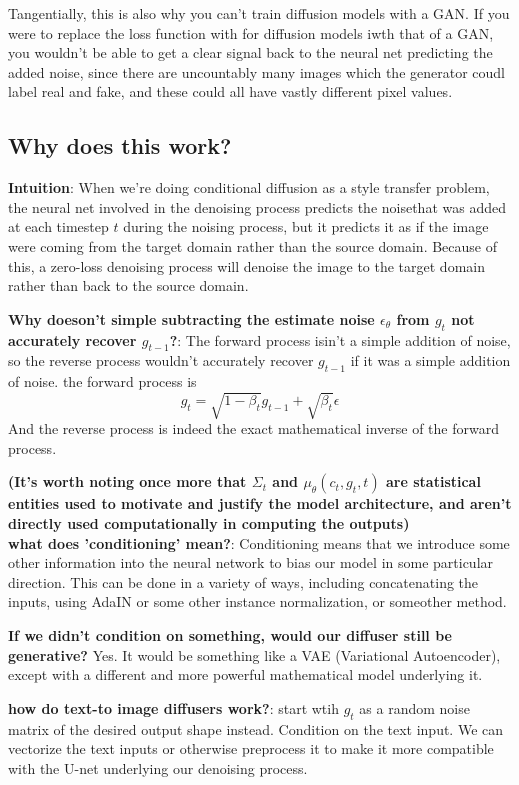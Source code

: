 \documentclass[12pt]{article}
\begin{document}
Tangentially, this is also why you can't train diffusion models with a GAN. If you were to replace the loss function with for diffusion models iwth that of a GAN, you wouldn't be able to get a clear signal back to the neural net predicting the added noise, since there are uncountably many images which the generator coudl label real and fake, and these could all have vastly different pixel values. 
\subsection{Why does this work?}

\textbf{Intuition}: When we're doing conditional diffusion as a style transfer problem, the neural net involved in the denoising process predicts the noisethat was added at each timestep \(t\) during the noising process, but it predicts it as if the image were coming from the target domain rather than the source domain. Because of this, a zero-loss denoising process will denoise the image to the target domain rather than back to the source domain.

\textbf{Why doeson't simple subtracting the estimate noise \(\epsilon_\theta\) from \(g_t\) not accurately recover \(g_{t-1}\)?}: The forward process isin't a simple addition of noise, so the reverse process wouldn't accurately recover \(g_{t-1}\) if it was a simple addition of noise. the forward process is 
\[g_t = \sqrt{1 - \beta_t}g_{t-1} + \sqrt{\beta_t}\epsilon\] And the reverse process is indeed the exact mathematical inverse of the forward process.

\textbf{(It's worth noting once more that \(\Sigma_t\) and \(\mu_\theta(c_t, g_t,t)\) are statistical entities used to motivate and justify the model architecture, and aren't directly used computationally in computing the outputs)}\\

\textbf{what does 'conditioning' mean?}: Conditioning means that we introduce some other information into the neural network to bias our model in some particular direction. This can be done in a variety of ways, including concatenating the inputs, using AdaIN or some other instance normalization, or someother method.

\textbf{If we didn't condition on something, would our diffuser still be generative?} Yes. It would be something like a VAE (Variational Autoencoder), except with a different and more powerful mathematical model underlying it. 

\textbf{how do text-to image diffusers work?}: start wtih \(g_t\) as a random noise matrix of the desired output shape instead. Condition on the text input. We can vectorize the text inputs or otherwise preprocess it to make it more compatible with the U-net underlying our denoising process.
\end{document}
